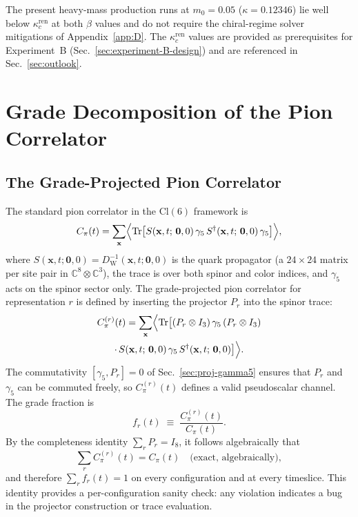 \documentclass[12pt]{article}
\theoremstyle{definition}
\theoremstyle{remark}
\newcommand{\cl}{\mathrm{Cl}}           %
\newcommand{\tr}{\mathrm{Tr}}           %
\newcommand{\dW}{D_{\mathrm{W}}}        %
\newcommand{\kcren}{\kappa_{c}^{\mathrm{ren}}}      %
\begin{document}
	The present heavy-mass production runs at $m_0=0.05$ ($\kappa=0.12346$)
	lie well below $\kcren$ at both $\beta$ values and do not require the
	chiral-regime solver mitigations of Appendix~\ref{app:D}.  The
	$\kcren$ values are provided as prerequisites for Experiment~B
	(Sec.~\ref{sec:experiment-B-design}) and are referenced in
	Sec.~\ref{sec:outlook}.
	
	\section{Grade Decomposition of the Pion Correlator}
	\label{sec:grade-decomp}
	
	\subsection{The Grade-Projected Pion Correlator}
	\label{sec:correlator-def}
	
	The standard pion correlator in the $\cl(6)$ framework is
	\begin{equation}
		C_\pi(t) = \sum_{\mathbf{x}}\Bigl\langle
		\tr\bigl[S(\mathbf{x},t;\,\mathbf{0},0)\,\gamma_5\,
		S^\dagger(\mathbf{x},t;\,\mathbf{0},0)\,\gamma_5\bigr]
		\Bigr\rangle,
		\label{eq:pion-correlator}
	\end{equation}
	where $S(\mathbf{x},t;\mathbf{0},0) = \dW^{-1}(\mathbf{x},t;\mathbf{0},0)$
	is the quark propagator (a $24\times24$ matrix per site pair in
	$\mathbb{C}^8\otimes\mathbb{C}^3$), the trace is over both spinor and color
	indices, and $\gamma_5$ acts on the spinor sector only.  The grade-projected
	pion correlator for representation $r$ is defined by inserting the projector
	$P_r$ into the spinor trace:
	\begin{multline}
		C_\pi^{(r)}(t) = \sum_{\mathbf{x}}\Bigl\langle
		\tr\bigl[(P_r\otimes I_3)\,\gamma_5\,(P_r\otimes I_3) \\
		\cdot\,S(\mathbf{x},t;\,\mathbf{0},0)\,\gamma_5\,
		S^\dagger(\mathbf{x},t;\,\mathbf{0},0)\bigr]
		\Bigr\rangle.
		\label{eq:grade-projected-correlator}
	\end{multline}
	The commutativity $[\gamma_5, P_r]=0$ of Sec.~\ref{sec:proj-gamma5} ensures
	that $P_r$ and $\gamma_5$ can be commuted freely, so $C_\pi^{(r)}(t)$ defines
	a valid pseudoscalar channel.  The grade fraction is
	\begin{equation}
		f_r(t) \;\equiv\; \frac{C_\pi^{(r)}(t)}{C_\pi(t)}.
		\label{eq:grade-fraction}
	\end{equation}
	By the completeness identity $\sum_r P_r = I_8$, it follows algebraically that
	\begin{equation}
		\sum_r C_\pi^{(r)}(t) = C_\pi(t)
		\quad\text{(exact, algebraically)},
		\label{eq:correlator-completeness}
	\end{equation}
	and therefore $\sum_r f_r(t) = 1$ on every configuration and at every
	timeslice.  This identity provides a per-configuration sanity check: any
	violation indicates a bug in the projector construction or trace evaluation.
	
\end{document}
